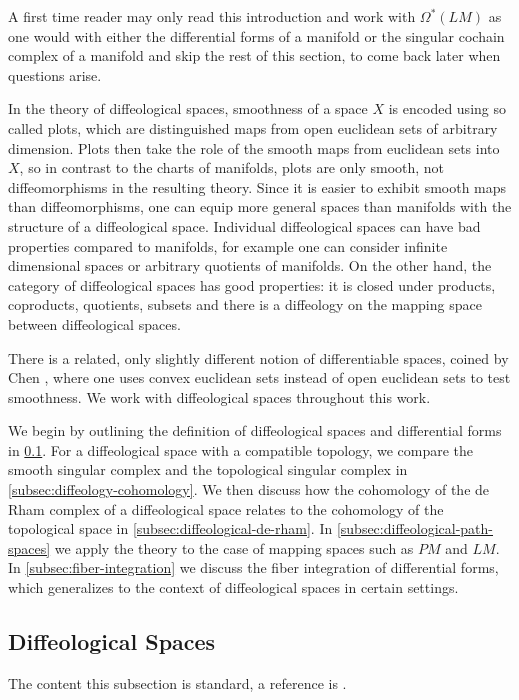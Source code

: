 \documentclass{scrartcl}
\theoremstyle{plain}
\theoremstyle{definition}
\begin{document}
A first time reader may only read this introduction and work with $\Omega^*(LM)$ as one would with either the differential forms of a manifold or the singular cochain complex of a manifold and skip the rest of this section, to come back later when questions arise. 

In the theory of diffeological spaces, smoothness of a space $X$ is encoded using so called plots, which are distinguished maps from open euclidean sets of arbitrary dimension. Plots then take the role of the smooth maps from euclidean sets into $X$, so in contrast to the charts of manifolds, plots are only smooth, not diffeomorphisms in the resulting theory. Since it is easier to exhibit smooth maps than diffeomorphisms, one can equip more general spaces than manifolds with the structure of a diffeological space. Individual diffeological spaces can have bad properties compared to manifolds, for example one can consider infinite dimensional spaces or arbitrary quotients of manifolds. On the other hand, the category of diffeological spaces has good properties: it is closed under products, coproducts, quotients, subsets and there is a diffeology on the mapping space between diffeological spaces. 

There is a related, only slightly different notion of differentiable spaces, coined by Chen \cite{chen1973iterated}, where one uses convex euclidean sets instead of open euclidean sets to test smoothness. We work with diffeological spaces throughout this work. 

We begin by outlining the definition of diffeological spaces and differential forms in \cref{subsec:diffeological}. For a diffeological space with a compatible topology, we compare the smooth singular complex and the topological singular complex in \cref{subsec:diffeology-cohomology}. We then discuss how the cohomology of the de Rham complex of a diffeological space relates to the cohomology of the topological space in  \cref{subsec:diffeological-de-rham}. In \cref{subsec:diffeological-path-spaces} we apply the theory to the case of mapping spaces such as $PM$ and $LM$. In \cref{subsec:fiber-integration} we discuss the fiber integration of differential forms, which generalizes to the context of diffeological spaces in certain settings. 



\subsection{Diffeological Spaces}\label{subsec:diffeological}
The content this subsection is standard, a reference is \cite{iglesias2013diffeology}.
\end{document}
